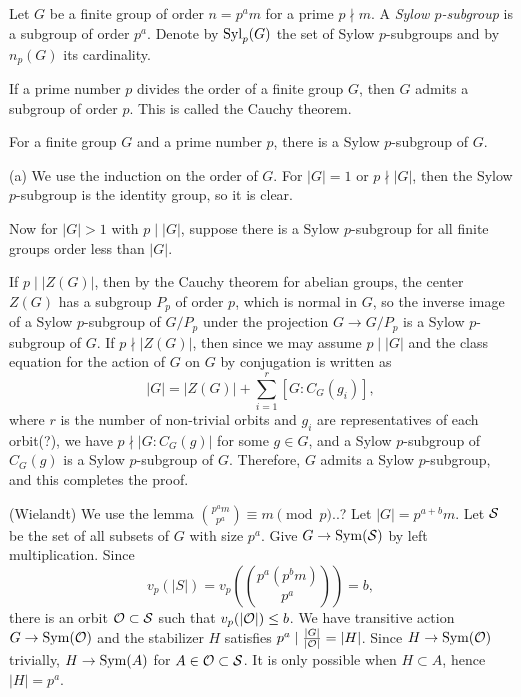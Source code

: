 \documentclass{../../large}
\begin{document}
\begin{prb}
Let $G$ be a finite group of order $n=p^am$ for a prime $p\nmid m$.
A \emph{Sylow $p$-subgroup} is a subgroup of order $p^a$.
Denote by $\operatorname{Syl}_p(G)$ the set of Sylow $p$-subgroups and by $n_p(G)$ its cardinality.
\begin{parts}
\item If a prime number $p$ divides the order of a finite group $G$, then $G$ admits a subgroup of order $p$. This is called the Cauchy theorem.
\item For a finite group $G$ and a prime number $p$, there is a Sylow $p$-subgroup of $G$.
\end{parts}
\end{prb}
\begin{pf}
(a)
We use the induction on the order of $G$.
For $|G|=1$ or $p\nmid|G|$, then the Sylow $p$-subgroup is the identity group, so it is clear.

Now for $|G|>1$ with $p\mid|G|$, suppose there is a Sylow $p$-subgroup for all finite groups order less than $|G|$.

If $p\mid|Z(G)|$, then by the Cauchy theorem for abelian groups, the center $Z(G)$ has a subgroup $P_p$ of order $p$, which is normal in $G$, so the inverse image of a Sylow $p$-subgroup of $G/P_p$ under the projection $G\to G/P_p$ is a Sylow $p$-subgroup of $G$.
If $p\nmid|Z(G)|$, then since we may assume $p\mid|G|$ and the class equation for the action of $G$ on $G$ by conjugation is written as
\[|G|=|Z(G)|+\sum_{i=1}^r[G:C_G(g_i)],\]
where $r$ is the number of non-trivial orbits and $g_i$ are representatives of each orbit(?), we have $p\nmid|G:C_G(g)|$ for some $g\in G$, and a Sylow $p$-subgroup of $C_G(g)$ is a Sylow $p$-subgroup of $G$.
Therefore, $G$ admits a Sylow $p$-subgroup, and this completes the proof.

(Wielandt)
We use the lemma $\binom{p^am}{p^a}\equiv m\pmod p$..?
Let $|G|=p^{a+b}m$.
Let $\mathcal{S}$ be the set of all subsets of $G$ with size $p^a$.
Give $G\to\operatorname{Sym}(\mathcal{S})$ by left multiplication.
Since
\[v_p(|S|)=v_p(\binom{p^a(p^bm)}{p^a})=b,\]
there is an orbit $\mathcal{O}\subset\mathcal{S}$ such that $v_p(|\mathcal{O}|)\le b$.
We have transitive action $G\to\operatorname{Sym}(\mathcal{O})$ and the stabilizer $H$ satisfies $p^a\mid\frac{|G|}{|\mathcal{O}|}=|H|$.
Since $H\to\operatorname{Sym}(\mathcal{O})$ trivially, $H\to\operatorname{Sym}(A)$ for $A\in\mathcal{O}\subset\mathcal{S}$.
It is only possible when $H\subset A$, hence $|H|=p^a$.
\end{pf}
\end{document}
